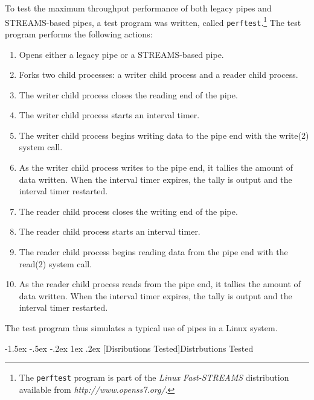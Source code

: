 \documentclass[letterpaper,final,notitlepage,twocolumn,10pt,twoside]{article}
\makeatletter
\let\normalsize\small
\let\small\footnotesize
\let\footnotesize\scriptsize
\let\scriptsize\tiny
\renewcommand\subsection{\@startsection{subsection}{2}{\z@}%
                                     {-1.5ex \@plus -.5ex \@minus -.2ex}%
                                     {1ex \@plus .2ex}%
                                     {\normalfont\normalsize\bfseries}}
\makeatother
\begin{document}
To test the maximum throughput performance of both legacy pipes and
STREAMS-based pipes, a test program was written, called
\texttt{perftest}.\footnote{The \texttt{perftest} program is part of the
\textsl{Linux Fast-STREAMS} distribution available from
\textit{http://www.openss7.org/}.} The test program performs the following
actions:

\begin{enumerate}

\item Opens either a legacy pipe or a STREAMS-based pipe.

\item Forks two child processes: a writer child process and a reader child process.

\item The writer child process closes the reading end of the pipe.

\item The writer child process starts an interval timer.

\item The writer child process begins writing data to the pipe end with the write(2) system
call.

\item As the writer child process writes to the pipe end, it tallies the amount of data written.
When the interval timer expires, the tally is output and the interval timer restarted.

\item The reader child process closes the writing end of the pipe.

\item The reader child process starts an interval timer.

\item The reader child process begins reading data from the pipe end with the read(2)
system call.

\item As the reader child process reads from the pipe end, it tallies the amount of data written.
When the interval timer expires, the tally is output and the interval timer restarted.

\end{enumerate}

The test program thus simulates a typical use of pipes in a Linux system.

\subsection[Disributions Tested]{Distrbutions Tested}
\end{document}
